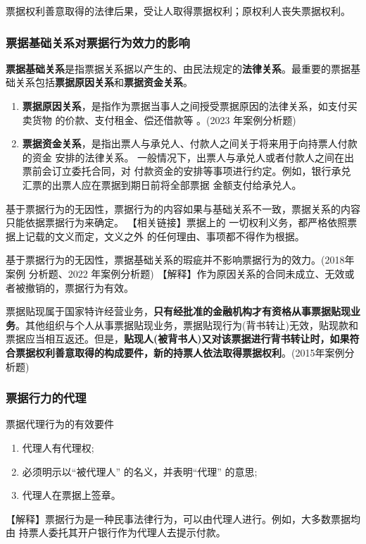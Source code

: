 \documentclass[UTF8,12pt]{ctexart}
\numberwithin{equation}{section} %
\numberwithin{figure}{section}
\numberwithin{table}{section}
\begin{document}
	票据权利善意取得的法律后果，受让人取得票据权利；原权利人丧失票据权利。
	
	\subsubsection{票据基础关系对票据行为效力的影响} 

	\textbf{票据基础关系}是指票据关系据以产生的、由民法规定的\textbf{法律关系}。最重要的票据基础关系包括\textbf{票据原因关系}和\textbf{票据资金关系}。
	\begin{enumerate}
		\item \textbf{票据原因关系}，是指作为票据当事人之间授受票据原因的法律关系，如支付买卖货物 的价款、支付租金、偿还借款等 。(2023 年案例分析题) 
		
		\item \textbf{票据资金关系}，是指出票人与承兑人、付款人之间关于将来用于向持票人付款的资金 安排的法律关系。 一般情况下，出票人与承兑人或者付款人之间在出票前会订立委托合同，对 付款资金的安排等事项进行约定。例如，银行承兑汇票的出票人应在票据到期日前将全部票据 金额支付给承兑人。
	\end{enumerate}

	
	基于票据行为的无因性，票据行为的内容如果与基础关系不一致，票据关系的内容只能依据票据行为来确定。
	【相关链接】票据上的 一切权利义务，都严格依照票据上记载的文义而定，文义之外 的任何理由、事项都不得作为根据。
	
	基于票据行为的无因性，票据基础关系的瑕疵并不影响票据行为的效力。(2018年案例 分析题、2022 年案例分析题)
	【解释】作为原因关系的合同未成立、无效或者被撤销的，票据行为有效。
	
	票据贴现属于国家特许经营业务，\textbf{只有经批准的金融机构才有资格从事票据贴现业务}。其他组织与个人从事票据贴现业务，票据贴现行为(背书转让)无效，贴现款和票据应当相互返还。但是，\textbf{贴现人(被背书人)又对该票据进行背书转让时，如果符合票据权利善意取得的构成要件，新的持票人依法取得票据权利}。(2015年案例分析题)
	
	
	
	\subsubsection{票据行力的代理}
	
	票据代理行为的有效要件
	\begin{enumerate}
		\item 代理人有代理权;
		
		\item 必须明示以“被代理人” 的名义，并表明“代理” 的意思; 
		
		\item 代理人在票据上签章。
	\end{enumerate}
	【解释】票据行为是一种民事法律行为，可以由代理人进行。例如，大多数票据均由 持票人委托其开户银行作为代理人去提示付款。
	
\end{document}
